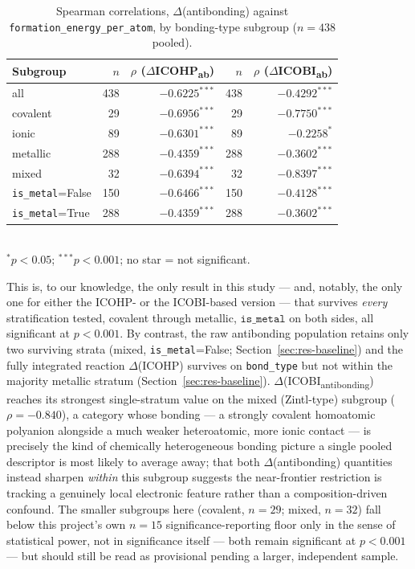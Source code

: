 \documentclass[journal=jpccck,manuscript=article]{achemso}
\begin{document}
\begin{table}[htbp]
\centering
\caption{Spearman correlations, $\Delta$(antibonding) against
\texttt{formation\_energy\_per\_atom}, by bonding-type subgroup ($n=438$
pooled).}
\label{tab:delta-antibonding-stratified}
\begin{tabular}{@{}lrrrr@{}}
\toprule
Subgroup & $n$ & $\rho$ ($\Delta$ICOHP\textsubscript{ab}) & $n$ & $\rho$ ($\Delta$ICOBI\textsubscript{ab}) \\
\midrule
all              & 438 & $-0.6225^{***}$ & 438 & $-0.4292^{***}$ \\
covalent         & 29  & $-0.6956^{***}$ & 29  & $-0.7750^{***}$ \\
ionic            & 89  & $-0.6301^{***}$ & 89  & $-0.2258^{*}$ \\
metallic         & 288 & $-0.4359^{***}$ & 288 & $-0.3602^{***}$ \\
mixed            & 32  & $-0.6394^{***}$ & 32  & $-0.8397^{***}$ \\
\texttt{is\_metal}=False & 150 & $-0.6466^{***}$ & 150 & $-0.4128^{***}$ \\
\texttt{is\_metal}=True  & 288 & $-0.4359^{***}$ & 288 & $-0.3602^{***}$ \\
\bottomrule
\end{tabular}
\vspace{0.1cm}
\\{\footnotesize $^{*}p<0.05$; $^{***}p<0.001$; no star = not significant.}
\end{table}

This is, to our knowledge, the only result in this study --- and, notably,
the only one for either the ICOHP- or the ICOBI-based version --- that
survives \emph{every} stratification tested, covalent through metallic,
$\texttt{is\_metal}$ on both sides, all significant at $p<0.001$. By
contrast, the raw antibonding population retains only two surviving strata
(mixed, \texttt{is\_metal}=False; Section~\ref{sec:res-baseline}) and the
fully integrated reaction $\Delta$(ICOHP) survives on \texttt{bond\_type}
but not within the majority metallic stratum
(Section~\ref{sec:res-baseline}). $\Delta$(ICOBI\textsubscript{antibonding})
reaches its strongest single-stratum value on the mixed (Zintl-type)
subgroup ($\rho=-0.840$), a category whose bonding --- a strongly covalent
homoatomic polyanion alongside a much weaker heteroatomic, more ionic
contact --- is precisely the kind of chemically heterogeneous bonding
picture a single pooled descriptor is most likely to average away; that both
$\Delta$(antibonding) quantities instead sharpen \emph{within} this subgroup
suggests the near-frontier restriction is tracking a genuinely local
electronic feature rather than a composition-driven confound. The smaller
subgroups here (covalent, $n=29$; mixed, $n=32$) fall below this project's
own $n=15$ significance-reporting floor only in the sense of statistical
power, not in significance itself --- both remain significant at
$p<0.001$ --- but should still be read as provisional pending a larger,
independent sample.
\end{document}
